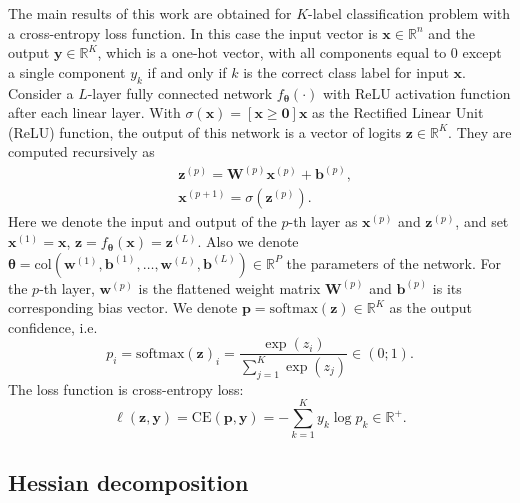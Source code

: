 \documentclass{article}
\begin{document}
The main results of this work are obtained for $K$-label classification problem with a cross-entropy loss function. In this case the input vector is $\mathbf{x} \in \mathbb{R}^{n}$ and the output $\mathbf{y} \in \mathbb{R}^{K}$, which is a one-hot vector, with all components equal to $0$ except a single component $y_k$ if and only if $k$ is the correct class label for input $\mathbf{x}$. Consider a $L$-layer fully connected network $f_{\boldsymbol{\theta}}(\cdot)$ with ReLU activation function after each linear layer. With $\sigma(\mathbf{x}) = \left[ \mathbf{x} \geqslant \mathbf{0} \right] \mathbf{x}$ as the Rectified Linear Unit (ReLU) function, the output of this network is a vector of logits $\mathbf{z} \in \mathbb{R}^{K}$. They are computed recursively as
\begin{align*}\label{align:fc}
    &\mathbf{z}^{(p)} = \mathbf{W}^{(p)} \mathbf{x}^{(p)} + \mathbf{b}^{(p)}, \\
    &\mathbf{x}^{(p+1)} = \sigma(\mathbf{z}^{(p)}).
\end{align*}
Here we denote the input and output of the $p$-th layer as $\mathbf{x}^{(p)}$ and $\mathbf{z}^{(p)}$, and set $\mathbf{x}^{(1)} = \mathbf{x}$, $\mathbf{z} = f_{\boldsymbol{\theta}}(\mathbf{x}) = \mathbf{z}^{(L)}$. Also we denote $\boldsymbol{\theta} = \mathrm{col}(\mathbf{w}^{(1)}, \mathbf{b}^{(1)}, \ldots, \mathbf{w}^{(L)}, \mathbf{b}^{(L)}) \in \mathbb{R}^{P}$ the parameters of the network. For the $p$-th layer, $\mathbf{w}^{(p)}$ is the flattened weight matrix $\mathbf{W}^{(p)}$ and $\mathbf{b}^{(p)}$ is its corresponding bias vector. We denote $\mathbf{p} = \mathrm{softmax}(\mathbf{z}) \in \mathbb{R}^{K}$ as the output confidence, i.e.
\[ p_i = \mathrm{softmax}(\mathbf{z})_i = \dfrac{\exp{(z_i)}}{\sum_{j=1}^{K} \exp{(z_j)}} \in (0; 1). \] 
The loss function is cross-entropy loss: 
\[ \ell(\mathbf{z}, \mathbf{y}) = \mathrm{CE}(\mathbf{p}, \mathbf{y}) = - \sum_{k=1}^{K} y_k \log p_k \in \mathbb{R}^{+}. \]

\subsection{Hessian decomposition} 
\end{document}
